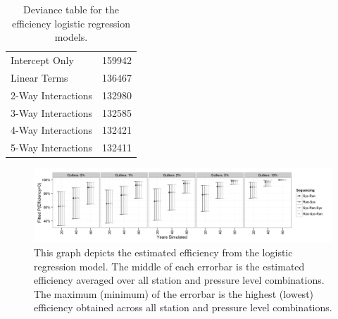 \documentclass[12pt]{article}
\begin{document}
\begin{table}[ht]
\centering
\begin{tabular}{ll}
  \hline
  \hline
Intercept Only & 159942 \\ 
  Linear Terms & 136467 \\ 
  2-Way Interactions & 132980 \\ 
  3-Way Interactions & 132585 \\ 
  4-Way Interactions & 132421 \\ 
  5-Way Interactions & 132411 \\ 
   \hline
\end{tabular}
\caption{Deviance table for the efficiency logistic regression models.}
\label{tab:devEff}
\end{table}


\begin{figure}[h!]
	\centering
	\includegraphics[width=\textwidth]{Efficiency_Order_Plot_BW}
	\caption{This graph depicts the estimated efficiency from the logistic regression model.  The middle of each errorbar is the estimated efficiency averaged over all station and pressure level combinations.  The maximum (minimum) of the errorbar is the highest (lowest) efficiency obtained across all station and pressure level combinations.}
	\label{fig:fitEffOrd}
\end{figure}
\end{document}
